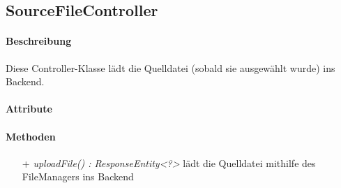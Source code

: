 \subsection{SourceFileController}

\paragraph{Beschreibung}
Diese Controller-Klasse lädt die Quelldatei (sobald sie ausgewählt wurde) ins Backend.


\paragraph{Attribute}

\paragraph{Methoden}
\begin{itemize}
\item[+] \textit{ uploadFile() : ResponseEntity<?>}
 lädt die Quelldatei mithilfe des FileManagers ins Backend 
\end{itemize}